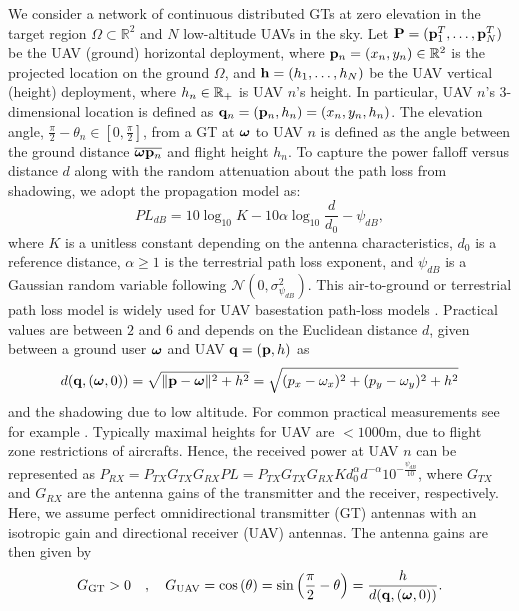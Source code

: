 \documentclass[smallabstract,smallcaptions]{dccpaper}
\newcounter{example}[section]
\newcommand{\bH}{\ensuremath{\vh}}          %
\newcommand{\GGT}{\ensuremath{G_{\text{GT}}}}         %
\newcommand{\GUAV}{\ensuremath{G_{\text{UAV}}}}         %
\begin{document}
We consider a network of continuous distributed GTs at zero elevation in the target region $\Omega\subset\mathbb{R}^2$
and $N$ low-altitude UAVs in the sky.  Let $\mathbf P =({\mathbf p}_1^T,\dots,{\mathbf p}_N^T)$ be the UAV (ground) horizontal deployment,
where ${\mathbf p}_n=(x_n, y_n)\in\mathbb{R}^2$ is the projected location on the ground $\Omega$, and $\bH=(h_1,\dots,h_N)$ be
the UAV vertical (height) deployment, where $h_n\in{\ensuremath{\mathbb R}}_+$ is UAV $n$'s height.  In particular, UAV $n$'s 3-dimensional
location is defined as ${\mathbf q}_n=({\mathbf p}_n,h_n)=(x_n,y_n, h_n)$.  The elevation angle,
$\frac{\pi}{2}\!-\!\theta_n\in[0,\frac{\pi}{2}]$, from a GT at $\boldsymbol{ \omega}$ to UAV $n$ is defined as the angle between the
ground distance $\overline{\boldsymbol{ \omega} {\mathbf p}_n}$ and flight height $h_n$.  To capture the power falloff versus distance $d$
along with the random attenuation about the path loss from shadowing, we adopt the propagation model \cite[(2.51)]{AG}
as:
%
\begin{equation}
  PL_{dB}=10\log_{10}{K}-10\alpha\log_{10}{\frac{d}{d_0}}-\psi_{dB},
\end{equation}
%
where $K$ is a unitless constant depending on the antenna characteristics, $d_0$ is a reference distance, $\alpha\geq 1$
is the terrestrial path loss exponent, and $\psi_{dB}$ is a Gaussian random variable following
$\mathcal{N}\left(0,\sigma^2_{\psi_{dB}}\right)$. This air-to-ground or terrestrial path loss model is widely used for
UAV basestation path-loss models \cite{MSBD16a}. Practical values are between $2$ and $6$ and depends on the Euclidean
distance $d$, given between a ground user $\boldsymbol{ \omega}$ and UAV ${\mathbf q}=({\mathbf p},h)$ as
%
\begin{align}
  d({\mathbf q},(\boldsymbol{ \omega},0))=\sqrt{\|{\mathbf p}-\boldsymbol{ \omega}\|^2+h^2}=\sqrt{(p_{x}-\omega_x)^2+(p_{y}-\omega_y)^2+h^2}\label{eq:eucd}
\end{align}
%
and the shadowing due to low altitude.  For common practical measurements see for example \cite{AG18}.  Typically
maximal heights for UAV are $<1000$m, due to flight zone restrictions of aircrafts.  Hence, the received power at
UAV $n$ can be represented as
%
  $P_{RX}=P_{TX}G_{TX}G_{RX}PL=P_{TX}G_{TX}G_{RX}Kd^{\alpha}_0 d^{-\alpha}10^{-\frac{\psi_{dB}}{10}}$,
%
where $G_{TX}$ and $G_{RX}$ are the antenna gains of the transmitter and the receiver, respectively. Here, we assume
perfect omnidirectional transmitter (GT) antennas with an isotropic gain and directional receiver (UAV) antennas.  The
antenna gains are then given by 
%
\begin{equation}
\GGT >0\quad,\quad
  \GUAV = \cos\left(\theta\right)=\sin\left(\frac{\pi}{2}-\theta\right)=\frac{h}{d(\vq,(\vome,0))}.
\label{eq:Gdirected}
\end{equation}
\end{document}
